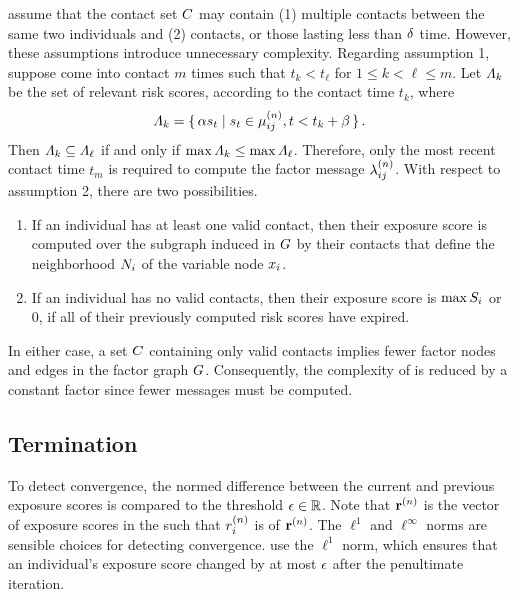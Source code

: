 \citet{Ayday2021} assume that the contact set $C$ may contain (1) multiple contacts between the same two individuals and (2)  contacts, or those lasting less than $\delta$ time. However, these assumptions introduce unnecessary complexity. Regarding assumption 1, suppose  come into contact $m$ times such that $t_k < t_\ell$ for $1 \leq k < \ell \leq m$. Let $\varLambda_k$ be the set of relevant risk scores, according to the contact time $t_k$, where
\begin{equation*}
  \varLambda_k = \set{ \alpha s_t | s_t \in \mu_{ij}^{(n)}, t < t_k + \beta}.
\end{equation*}
Then $\varLambda_k \subseteq \varLambda_\ell$ if and only if $\max \varLambda_k \leq \max \varLambda_\ell$. Therefore, only the most recent contact time $t_m$ is required to compute the factor message $\lambda_{ij}^{(n)}$. With respect to assumption 2, there are two possibilities.
\begin{enumerate}
  \item If an individual has at least one valid contact, then their exposure score is computed over the subgraph induced in $G$ by their contacts that define the neighborhood $N_i$ of the variable node $\vVariable_i$.
  \item If an individual has no valid contacts, then their exposure score is $\max S_i$ or $0$, if all of their previously computed risk scores have expired.
\end{enumerate}
In either case, a set $C$ containing only valid contacts implies fewer factor nodes and edges in the factor graph $G$. Consequently, the complexity of \cRiskPropagation{} is reduced by a constant factor since fewer messages must be computed.

\subsection{Termination}

To detect convergence, the normed difference between the current and previous exposure scores is compared to the threshold $\epsilon \in \mathbb{R}$. Note that $\mathbf{r}^{(n)}$ is the vector of exposure scores in the  such that $r_{i}^{(n)}$ is  of $\mathbf{r}^{(n)}$. The $\ell^1$ and $\ell^\infty$ norms are sensible choices for detecting convergence. \citet{Ayday2021} use the $\ell^1$ norm, which ensures that an individual's exposure score changed by at most $\epsilon$ after the penultimate iteration.

